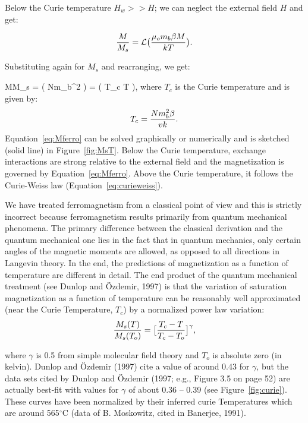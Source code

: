 {Below the Curie temperature $H_w>>H$;  we can neglect the external field $H$  and 
get:


$$
{M\over {M_s}} = \mathcal{L}  \bigl( {{\mu_o m_b \beta M}\over{kT}}\bigr).
$$ 

\noindent Substituting again for $M_s$ and rearranging, we get:


\beq
{M\over M_s} =  \bigl( {{Nm_b^2 \beta}}
\bigr) =
  \bigl( {T_c \over T}  \bigr),
\label{eq:Mferro}
\eeq
{}%
\noindent where $T_c$ is the Curie temperature and is given by:
$$T_c = { {Nm_b^2 \beta}\over{vk}}.$$
\noindent  
Equation~\ref{eq:Mferro} can be solved graphically or
numerically and is sketched (solid line)  in Figure~\ref{fig:MsT}.  Below the Curie
temperature, exchange interactions are strong relative to the
external field and  the magnetization is
governed by Equation~\ref{eq:Mferro}. Above the Curie temperature, it
follows the Curie-Weiss law (Equation~\ref{eq:curieweiss}).  




We have treated ferromagnetism from a classical point of view and this is strictly incorrect because ferromagnetism  results primarily from quantum mechanical phenomena.  The primary difference  between the classical derivation and the quantum mechanical one lies in the fact that in quantum mechanics, only certain angles of the magnetic moments are allowed, as opposed to all directions in Langevin theory.  In the end, the predictions of magnetization as a function of temperature are different in detail.   The end product of the quantum mechanical treatment 
(see Dunlop and \"Ozdemir, 1997) \nocite{dunlop97} is that the variation of 
saturation magnetization as a function of temperature can be reasonably well approximated (near the
 Curie Temperature, $T_c$) by a normalized power law variation:
\begin{equation}
{M_s(T)\over {M_s(T_o)}} = \bigl[{  {T_c - T}\over{T_c-T_o}} \bigr]^{\gamma },
\label{eq:MsT}
\end{equation}

\noindent  where  $\gamma$ is 0.5 from simple molecular field theory and $T_o$ is absolute zero (in kelvin).   Dunlop and \"Ozdemir (1997) cite a value of around 0.43 for $\gamma$, but the  data sets cited by Dunlop and \"Ozdemir (1997; e.g., Figure 3.5 on page 52) are actually best-fit with values for $\gamma$ of about 0.36 -- 0.39 (see Figure~\ref{fig:curie}).   These curves have been normalized by their inferred curie Temperatures which are around 565$^{\circ}$C (data of B. Moskowitz, cited in
 Banerjee, 1991).  \nocite{banerjee91} 

}
